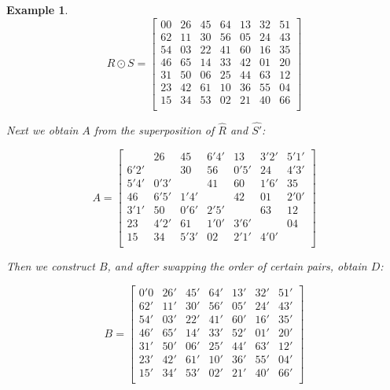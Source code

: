 \documentclass[
  11pt,
  a4paper]{book}
\newtheorem{example}{Example}
\begin{document}
\begin{example}
\begin{equation}
  R \odot S = \begin{bmatrix}
      00 & 26 & 45 & 64 & 13 & 32 & 51 \\
      62 & 11 & 30 & 56 & 05 & 24 & 43 \\
      54 & 03 & 22 & 41 & 60 & 16 & 35 \\
      46 & 65 & 14 & 33 & 42 & 01 & 20 \\
      31 & 50 & 06 & 25 & 44 & 63 & 12 \\
      23 & 42 & 61 & 10 & 36 & 55 & 04 \\
      15 & 34 & 53 & 02 & 21 & 40 & 66 \\
  \end{bmatrix}
\end{equation}

Next we obtain $A$ from the superposition of $\hat{R}$ and
$\hat{S'}$:

\begin{equation}
  A = \begin{bmatrix}
           & 26   & 45   & 6'4' & 13   & 3'2' & 5'1' \\
      6'2' &      & 30   & 56   & 0'5' & 24   & 4'3' \\
      5'4' & 0'3' &      & 41   & 60   & 1'6' & 35   \\
      46   & 6'5' & 1'4' &      & 42   & 01   & 2'0' \\
      3'1' & 50   & 0'6' & 2'5' &      & 63   & 12   \\
      23   & 4'2' & 61   & 1'0' & 3'6' &      & 04   \\
      15   & 34   & 5'3' & 02   & 2'1' & 4'0' &      \\
  \end{bmatrix}
\end{equation}

Then we construct $B$, and after swapping the order of
certain pairs, obtain $D$:

\begin{equation}
  B = \begin{bmatrix}
      0'0 & 26' & 45' & 64' & 13' & 32' & 51'  \\
      62' & 11' & 30' & 56' & 05' & 24' & 43'  \\
      54' & 03' & 22' & 41' & 60' & 16' & 35'  \\
      46' & 65' & 14' & 33' & 52' & 01' & 20'  \\
      31' & 50' & 06' & 25' & 44' & 63' & 12'  \\
      23' & 42' & 61' & 10' & 36' & 55' & 04'  \\
      15' & 34' & 53' & 02' & 21' & 40' & 66'  \\
  \end{bmatrix}
\end{equation}


\end{example}
\end{document}
